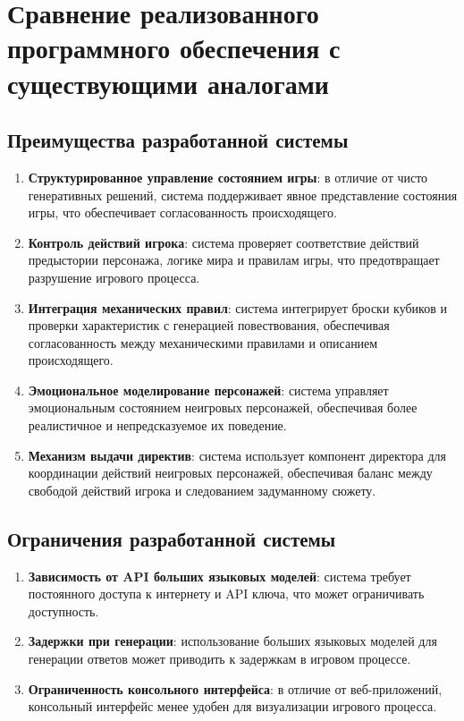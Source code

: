 \section{Сравнение реализованного программного обеспечения с существующими аналогами}

\subsection{Преимущества разработанной системы}

\begin{enumerate}
	\item \textbf{Структурированное управление состоянием игры}: в отличие от чисто генеративных решений, система поддерживает явное представление состояния игры, что обеспечивает согласованность происходящего.
	
	\item \textbf{Контроль действий игрока}: система проверяет соответствие действий предыстории персонажа, логике мира и правилам игры, что предотвращает разрушение игрового процесса.
	
	\item \textbf{Интеграция механических правил}: система интегрирует броски кубиков и проверки характеристик с генерацией повествования, обеспечивая согласованность между механическими правилами и описанием происходящего.
	
	\item \textbf{Эмоциональное моделирование персонажей}: система управляет эмоциональным состоянием неигровых персонажей, обеспечивая более реалистичное и непредсказуемое их поведение.
	
	\item \textbf{Механизм выдачи директив}: система использует компонент директора для координации действий неигровых персонажей, обеспечивая баланс между свободой действий игрока и следованием задуманному сюжету.
\end{enumerate}

\subsection{Ограничения разработанной системы}

\begin{enumerate}
	\item \textbf{Зависимость от API больших языковых моделей}: система требует постоянного доступа к интернету и API ключа, что может ограничивать доступность.
	
	\item \textbf{Задержки при генерации}: использование больших языковых моделей для генерации ответов может приводить к задержкам в игровом процессе.
	
	\item \textbf{Ограниченность консольного интерфейса}: в отличие от веб-приложений, консольный интерфейс менее удобен для визуализации игрового процесса.
\end{enumerate}




